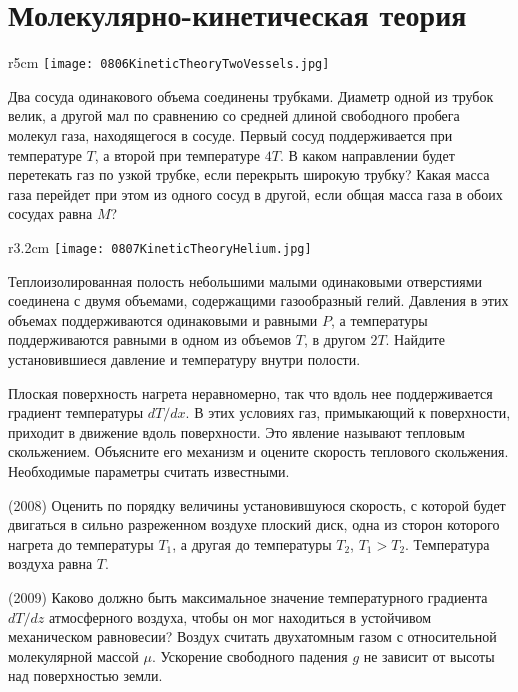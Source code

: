 \section{Молекулярно-кинетическая теория}

\begin{wrapfigure}{r}{5cm}
\texttt{[image: 0806KineticTheoryTwoVessels.jpg]}
\end{wrapfigure}

\AddProb Два сосуда одинакового объема соединены трубками. Диаметр одной из трубок велик, 
а другой мал по сравнению со средней длиной свободного пробега молекул газа, находящегося в сосуде. 
Первый сосуд поддерживается при температуре $T$, а второй при температуре $4T$. 
В каком направлении будет перетекать газ по узкой трубке, если перекрыть широкую трубку? 
Какая масса газа перейдет при этом из одного сосуд в другой, если общая масса газа в обоих сосудах равна $M$?

\begin{wrapfigure}{r}{3.2cm}
\texttt{[image: 0807KineticTheoryHelium.jpg]}
\end{wrapfigure}

\AddProb Теплоизолированная полость небольшими малыми одинаковыми отверстиями соединена с двумя объемами, содержащими газообразный гелий. 
Давления в этих объемах поддерживаются одинаковыми и равными $P$, а температуры поддерживаются равными в одном из объемов $T$, в другом $2T$. 
Найдите установившиеся давление и температуру внутри полости.

\AddProb Плоская поверхность нагрета неравномерно, так что вдоль нее поддерживается градиент температуры $dT/dx$. 
В этих условиях газ, примыкающий к поверхности, приходит в движение вдоль поверхности. Это явление называют тепловым скольжением. 
Объясните его механизм и оцените скорость теплового скольжения. Необходимые параметры считать известными.

\AddProb (2008) Оценить по порядку величины установившуюся скорость, с которой будет двигаться в сильно разреженном воздухе плоский диск, 
одна из сторон которого нагрета до температуры $T_1$, а другая до температуры $T_2$, $T_1>T_2$. Температура воздуха равна $T$.

\AddProb (2009) Каково должно быть максимальное значение температурного градиента $dT/dz$ атмосферного воздуха, 
чтобы он мог находиться в устойчивом механическом равновесии? Воздух считать двухатомным газом с относительной молекулярной массой $\mu$. 
Ускорение свободного падения $g$ не зависит от высоты над поверхностью земли.
